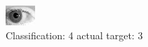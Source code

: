 \begin{figure}[h!]
\begin{center}
\includegraphics[width=0.60\columnwidth]{figures/ID207_class_4_target_3.png}
\end{center}
\caption{ Classification: 4 actual target: 3}
\label{fig:ID207_class_4_target_3}
\end{figure}
